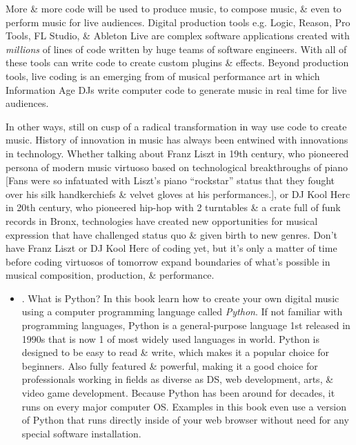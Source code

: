 \documentclass{article}
\begin{document}
\begin{itemize}
	More \& more code will be used to produce music, to compose music, \& even to perform music for live audiences. Digital production tools e.g. Logic, Reason, Pro Tools, FL Studio, \& Ableton Live are complex software applications created with {\it millions} of lines of code written by huge teams of software engineers. With all of these tools can write code to create custom plugins \& effects. Beyond production tools, live coding is an emerging from of musical performance art in which Information Age DJs write computer code to generate music in real time for live audiences.
	
	In other ways, still on cusp of a radical transformation in way use code to create music. History of innovation in music has always been entwined with innovations in technology. Whether talking about {\sc Franz Liszt} in 19th century, who pioneered persona of modern music virtuoso based on technological breakthroughs of piano [Fans were so infatuated with {\sc Liszt}'s piano ``rockstar'' status that they fought over his silk handkerchiefs \& velvet gloves at his performances.], or DJ {\sc Kool Herc} in 20th century, who pioneered hip-hop with 2 turntables \& a crate full of funk records in Bronx, technologies have created new opportunities for musical expression that have challenged status quo \& given birth to new genres. Don't have {\sc Franz Liszt} or DJ {\sc Kool Herc} of coding yet, but it's only a matter of time before coding virtuosos of tomorrow expand boundaries of what's possible in musical composition, production, \& performance.
	\begin{itemize}
		\item {. What is Python?} In this book learn how to create your own digital music using a computer programming language called {\it Python}. If not familiar with programming languages, Python is a general-purpose language 1st released in 1990s that is now 1 of most widely used languages in world. Python is designed to be easy to read \& write, which makes it a popular choice for beginners. Also fully featured \& powerful, making it a good choice for professionals working in fields as diverse as DS, web development, arts, \& video game development. Because Python has been around for decades, it runs on every major computer OS. Examples in this book even use a version of Python that runs directly inside of your web browser without need for any special software installation.
		

\end{itemize}
\end{itemize}
\end{document}
